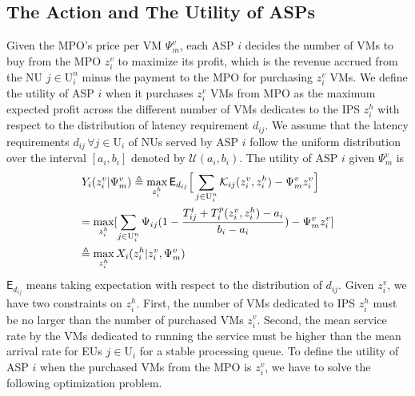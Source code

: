 \documentclass[conference]{IEEEtran}
\begin{document}
\subsection{The Action and The Utility of ASPs}
Given the MPO's price per VM $\Psi_m^v$, each ASP $i$ decides the number of VMs to buy from the MPO $z_i^v$ to maximize its profit, which is the revenue accrued from the NU $j \in \mathrm{U}_i^n$ minus the payment to the MPO for purchasing $z_i^v$ VMs. 
We define the utility of ASP $i$ when it purchases $z_i^v$ VMs from MPO as the maximum expected profit across the different number of VMs dedicates to the IPS $z_i^h$ with respect to the distribution of latency requirement $d_{ij}$. We assume that the latency requirements $d_{ij} \, \forall j \in \mathrm{U}_i$ of NUs served by ASP $i$ follow the uniform distribution over the interval $[a_i, b_i]$ denoted by $\mathcal{U}(a_i,b_i)$. %
The utility of ASP $i$ given $\Psi_m^v$ is
\begin{align}
&Y_i(z_i^v|\Psi_m^v) \triangleq \max_{z_i^h} \mathsf{E}_{d_{ij}}\Big[\sum_{j \in \mathrm{U}_i^n} \mathcal{K}_{ij}(z_i^v, z_i^h) - \Psi_m^v z_i^v\Big] \\
&\hspace*{-1mm}=\max_{z_i^h} [\sum_{j \in \mathrm{U}_i^n}\Psi_{ij}(1-\frac{T_{ij}^t + T_i^p(z_i^v, z_i^h)-a_i}{b_i-a_i}) - \Psi_m^vz_i^v] \label{eqn:asp_def_subobjective_unfold} \\
&\hspace*{-1mm}\triangleq \max_{z_i^h} X_i(z_i^h|z_i^v,\Psi_m^v) \label{eqn:asp_def_subobjective}
\end{align}
$\mathsf{E}_{d_{ij}}$ means taking expectation with respect to the distribution of $d_{ij}$.
Given $z_i^v$, we have two constraints on $z_i^h$. First, the number of VMs dedicated to IPS $z_i^h$ must be no larger than the number of purchased VMs $z_i^v$. Second, the mean service rate by the VMs dedicated to running the service must be higher than the mean arrival rate for EUs $j \in \mathrm{U}_i$ for a stable processing queue. To define the utility of ASP $i$ when the purchased VMs from the MPO is $z_i^v$, we have to solve the following optimization problem.
\end{document}
